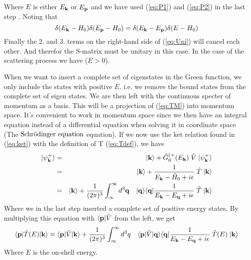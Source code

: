 %                                                 
Where $E$ is either $E_{\bf k}$ or $E_{\bf p}$ and we have used (\ref{eq:P1}) and (\ref{eq:P2}) in the last step 
. Noting that
%
\begin{equation}
\delta (E_{\bf k}-H_0 ) \delta (E_{\bf p}-H_0 ) = 
\delta (E_{\bf k}-E_{\bf p} ) \delta (E-H_0 ) 
\end{equation}
%
Finally the 2. and 3. terms on the right-hand side of (\ref{eq:Uni}) will
cancel each other. And therefor the S-matrix must be unitary in this case.
\newline
\newline
In the case of the scattering process we have ($E>0$).

When we want to insert a complete set of
eigenstates in the Green function, we only include the states with positive $E$. i.e.
we remove the bound states from the complete set of eigen states. We are then  
left with the continuous specter of momentum as a basis.
This will be a  projection of (\ref{eq:TM}) into momentum space. 
It's convenient to work in momentum space since 
we then have an integral equation instead of a differential equation when solving it in coordinate space 
(The $\text{Schr$\ddot{\textrm{o}}$dinger equation}$ equation). 
If we now use the ket relation found in (\ref{eq:ket}) with the definition of T (\ref{eq:Tdef}), we have 
%
\begin{eqnarray}  
|\psi_{\bf k}^{+}\rangle &=& |{\bf k}\rangle+\hat{G}^{(+}_0(E_{\bf k})\;\hat{V}\;
|\psi_{\bf k}^{+}\rangle \nonumber\\ 
&=&
|{\bf k}\rangle+ \frac{1}{E_{\bf k}-\hat{H}_0+i\epsilon}   \;\hat{T}\;
|{\bf k}\rangle\nonumber\\
&=&
|{\bf k}\rangle+ \frac{1}{(2\pi)^3}\int^{\infty}_{\infty}d^3 {\bf q}\quad |{\bf q}\rangle\langle{\bf q}|
\frac{1}{E_{\bf k}-E_{\bf q}+i\epsilon}   \;\hat{T}\;|{\bf k}\rangle
\end{eqnarray}  
%
Where we in the last step inserted a complete set of positive energy states.
By multiplying this equation with $\langle{\bf p}|\hat{V}$ from the left, we get 
%
\begin{equation}\label{eq:Tmatp}
\braketm{{\bf p}} {\op{T}(E)}{{\bf k}} =\braketm{{\bf p}}{\op{V}}{{\bf k}}
+ \inv{(2\pi)^3}\int^{\infty}_{\infty}d^3 { q} \quad\bra{{\bf p}}\op{V}\ket{{\bf q}}\bra{{\bf q}}
\inv{E_{\bf k}-E_{\bf q}+i\epsilon}   \;\op{T}(E)\;\ket{{\bf k}}
\end{equation}
%
Where $E$ is the on-shell energy.

